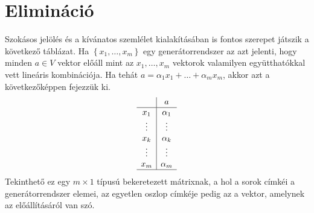 \documentclass[9pt, a4paper, showtrims]{memoir}
\theoremstyle{plain}
\theoremstyle{remark}
\theoremstyle{definition}
\begin{document}
\section{Elimináció}
Szokásos jelölés és a kívánatos szemlélet kialakításában is fontos szerepet játszik a következő táblázat.
Ha $\left\{ x_1,\dots,x_m \right\}$ egy generátorrendszer az azt jelenti, hogy minden $a\in V$ vektor
előáll mint az $x_1,\dots,x_m$ vektorok valamilyen együtthatókkal vett lineáris kombinációja.
Ha tehát $a=\alpha_1x_1+\dots+\alpha_mx_m$, akkor azt a következőképpen fejezzük ki.
\[
    \begin{array}{c|c}
        &a         \\
        \hline
        x_1         &\alpha_1   \\
        \vdots      &\vdots    \\
        x_k         &\alpha_k   \\
        \vdots      &\vdots    \\
        x_m         &\alpha_m   \\
        \hline
    \end{array}
\]
Tekinthető ez egy $m\times 1$ típusú bekeretezett mátrixnak, a hol a sorok címkéi a generátorrendszer elemei,
az egyetlen oszlop címkéje pedig az a vektor, amelynek az előállításáról van szó.
\end{document}
